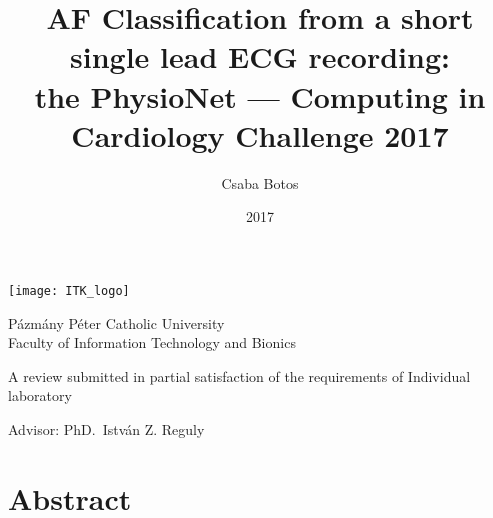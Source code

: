 \documentclass[11pt]{report}
\author{Csaba Botos}
\title{
AF Classification from a short single lead ECG recording:\\
the PhysioNet --- Computing in Cardiology Challenge 2017
}
\date{2017}
\begin{document}

\texttt{[image: ITK\_logo]} \parbox[c]{0.8\textwidth}{
Pázmány Péter Catholic University\\
Faculty of Information Technology and Bionics}
\vspace*{\fill}

{\let\newpage\relax\maketitle}
\vspace*{\fill}
\begin{center}
A review submitted in partial satisfaction of the requirements of Individual
laboratory
\bigskip

Advisor: PhD.\ István Z. Reguly \\
\end{center}
\clearpage


\chapter*{Abstract}

\clearpage
{}





\clearpage


\clearpage


\clearpage
\tableofcontents
\printbibliography
{}
\clearpage
\end{document}
